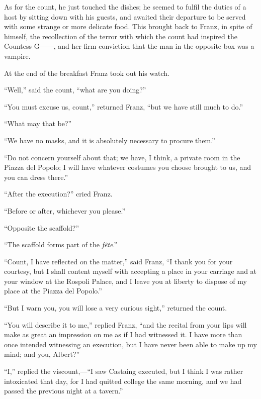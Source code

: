 As for the count, he just touched the dishes; he seemed to fulfil the
duties of a host by sitting down with his guests, and awaited their
departure to be served with some strange or more delicate food. This
brought back to Franz, in spite of himself, the recollection of the
terror with which the count had inspired the Countess G——, and her firm
conviction that the man in the opposite box was a vampire.

At the end of the breakfast Franz took out his watch.

“Well,” said the count, “what are you doing?”

“You must excuse us, count,” returned Franz, “but we have still much to
do.”

“What may that be?”

“We have no masks, and it is absolutely necessary to procure them.”

“Do not concern yourself about that; we have, I think, a private room
in the Piazza del Popolo; I will have whatever costumes you choose
brought to us, and you can dress there.”

“After the execution?” cried Franz.

“Before or after, whichever you please.”

“Opposite the scaffold?”

“The scaffold forms part of the \textit{fête}.”

“Count, I have reflected on the matter,” said Franz, “I thank you for
your courtesy, but I shall content myself with accepting a place in
your carriage and at your window at the Rospoli Palace, and I leave you
at liberty to dispose of my place at the Piazza del Popolo.”

“But I warn you, you will lose a very curious sight,” returned the
count.

“You will describe it to me,” replied Franz, “and the recital from your
lips will make as great an impression on me as if I had witnessed it. I
have more than once intended witnessing an execution, but I have never
been able to make up my mind; and you, Albert?”

“I,” replied the viscount,—“I saw Castaing executed, but I think I was
rather intoxicated that day, for I had quitted college the same
morning, and we had passed the previous night at a tavern.”


